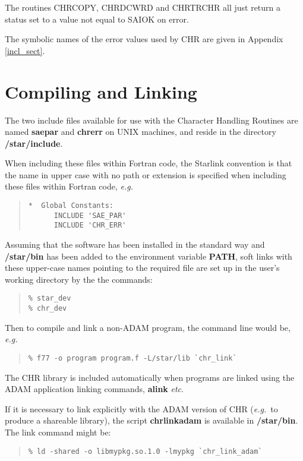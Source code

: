 \documentclass[twoside,11pt]{article}
\renewcommand{\_}{\texttt{\symbol{95}}}
\begin{document}
The routines CHR\_COPY, CHR\_DCWRD and CHR\_TRCHR all just return a status
set to a value not equal to SAI\_\_OK on error.

The symbolic names of the error values used by CHR are given in Appendix
\ref{incl_sect}.


\section {Compiling and Linking \label{compile_sect}}
The two include files available for use with the Character Handling Routines 
are named {\bf sae\_par} and {\bf chr\_err} on UNIX
machines, and reside in the directory {\bf /star/include}.

When including these files within Fortran code, the Starlink convention
is that the name in upper case with no path or extension is specified when 
including these files within Fortran code, 
{\em e.g.}
\begin{quote}
\begin{small}
\begin{verbatim}
*  Global Constants:
      INCLUDE 'SAE_PAR'
      INCLUDE 'CHR_ERR'
\end{verbatim}
\end{small}
\end{quote}
Assuming that the software has been installed in the standard way and
{\bf /star/bin} has been added to the environment variable
{\bf PATH}, soft links with these upper-case names pointing to the required 
file are set up in the user's working directory by the the commands:
\begin {quote}
\begin{small}
\begin{verbatim}
% star_dev
% chr_dev
\end{verbatim}
\end{small}
\end {quote}
Then to compile and link a non-ADAM program, the command line would be, 
{\em e.g.}
\begin {quote}
\begin{verbatim}
% f77 -o program program.f -L/star/lib `chr_link`
\end{verbatim}
\end {quote}
The CHR library is included automatically when programs are linked using the
ADAM application linking commands, {\bf alink} {\em etc}.

If it is necessary to link explicitly with the ADAM version of CHR 
({\em e.g.}\ to produce a shareable library), the 
script {\bf chr\_link\_adam} is available in {\bf /star/bin}. 
The link command might be:
\begin {quote}
\begin {small}
\begin{verbatim}
% ld -shared -o libmypkg.so.1.0 -lmypkg `chr_link_adam`
\end{verbatim}
\end {small}
\end {quote}
\end{document}
